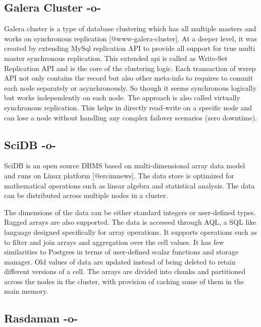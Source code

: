 \subsection{Galera Cluster -o-}

Galera cluster is a type of database clustering which has all multiple
masters and works on synchronous
replication [@www-galera-cluster].  At a deeper level, it was
created by extending MySql replication API to provide all support for
true multi master synchronous replication.  This extended api is
called as Write-Set Replication API and is the core of the clustering
logic.  Each transaction of wsrep API not only contains the record but
also other meta-info to requires to commit each node separately or
asynchronously. So though it seems synchronous logically but works
independently on each node.  The approach is also called virtually
synchronous replication. This helps in directly read-write on a
specific node and can lose a node without handling any complex
failover scenarios (zero downtime).



\subsection{SciDB -o-}

SciDB is an open source DBMS based on multi-dimensional array data
model and runs on Linux platform [@ercimnews]. The data store is
optimized for mathematical operations such as linear algebra and
statistical analysis. The data can be distributed across multiple
nodes in a cluster.

The dimensions of the data can be either standard integers or
user-defined types. Ragged arrays are also supported. The data is
accessed through AQL, a SQL like language designed specifically for
array operations. It supports operations such as to filter and join
arrays and aggregation over the cell values. It has few similarities
to Postgres in terms of user-defined scalar functions and storage
manager. Old values of data are updated instead of being deleted to
retain different versions of a cell.  The arrays are divided into
chunks and partitioned across the nodes in the cluster, with provision
of caching some of them in the main memory.



\subsection{Rasdaman -o-}

